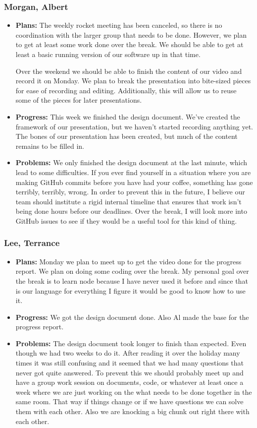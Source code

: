 \documentclass[10pt,draftclsnofoot,onecolumn]{IEEEtran}
\begin{document}
\subsubsection{Morgan, Albert}
\begin{itemize}
	\item \textbf{Plans: }
	The weekly rocket meeting has been canceled, so there is no coordination with the larger group that needs to be done. However, we plan to get at least some work done over the break. We should be able to get at least a basic running version of our software up in that time.

	Over the weekend we should be able to finish the content of our video and record it on Monday. We plan to break the presentation into bite-sized pieces for ease of recording and editing. Additionally, this will allow us to reuse some of the pieces for later presentations.
	\item \textbf{Progress: }
	This week we finished the design document. We've created the framework of our presentation, but we haven't started recording anything yet. The bones of our presentation has been created, but much of the content remains to be filled in.
	\item \textbf{Problems: }
	We only finished the design document at the last minute, which lead to some difficulties. If you ever find yourself in a situation where you are making GitHub commits before you have had your coffee, something has gone terribly, terribly, wrong. In order to prevent this in the future, I believe our team should institute a rigid internal timeline that ensures that work isn't being done hours before our deadlines. Over the break, I will look more into GitHub issues to see if they would be a useful tool for this kind of thing.
\end{itemize}
\subsubsection{Lee, Terrance}
\begin{itemize}
	\item \textbf{Plans: }Monday we plan to meet up to get the video done for the progress report.
	We plan on doing some coding over the break. My personal goal over the break is to learn node because I have never used it before and since that is our language for everything I figure it would be good to know how to use it.
	\item \textbf{Progress: }We got the design document done. Also Al made the base for the progress report.
	\item \textbf{Problems: }The design document took longer to finish than expected. Even though we had two weeks to do it. After reading it over the holiday many times it was still confusing and it seemed that we had many questions that never got quite answered. To prevent this we should probably meet up and have a group work session on documents, code, or whatever at least once a week where we are just working on the what needs to be done together in the same room. That way if things change or if we have questions we can solve them with each other. Also we are knocking a big chunk out right there with each other.
\end{itemize}
\end{document}
